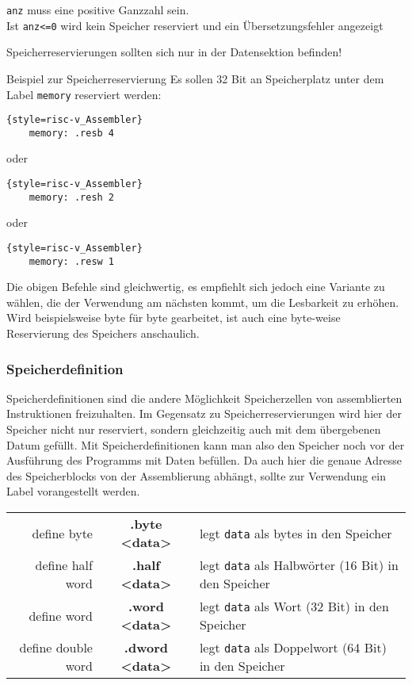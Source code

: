 \begin{warningblock}
	\texttt{anz} muss eine positive Ganzzahl sein.\\
	Ist \texttt{anz<=0} wird kein Speicher reserviert und ein Übersetzungsfehler angezeigt
\end{warningblock}

\begin{warningblock}
	Speicherreservierungen sollten sich nur in der Datensektion befinden!
\end{warningblock}

\begin{exampleblock}{Beispiel zur Speicherreservierung}
	Es sollen 32 Bit an Speicherplatz unter dem Label \texttt{memory} reserviert werden:\\
	\begin{lstlisting}{style=risc-v_Assembler}
	memory: .resb 4
	\end{lstlisting}
	oder
	\begin{lstlisting}{style=risc-v_Assembler}
	memory: .resh 2
	\end{lstlisting}
	oder
	\begin{lstlisting}{style=risc-v_Assembler}
	memory: .resw 1
	\end{lstlisting}
	Die obigen Befehle sind gleichwertig, es empfiehlt sich jedoch eine Variante zu wählen, die der Verwendung am nächsten kommt, um die Lesbarkeit zu erhöhen. Wird beispielsweise byte für byte gearbeitet, ist auch eine byte-weise Reservierung des Speichers anschaulich. 
\end{exampleblock}

\subsubsection{Speicherdefinition}

Speicherdefinitionen sind die andere Möglichkeit Speicherzellen von assemblierten Instruktionen freizuhalten. Im Gegensatz zu Speicherreservierungen wird hier der Speicher nicht nur reserviert, sondern gleichzeitig auch mit dem übergebenen Datum gefüllt. Mit Speicherdefinitionen kann man also den Speicher noch vor der Ausführung des Programms mit Daten befüllen. Da auch hier die genaue Adresse des Speicherblocks von der Assemblierung abhängt, sollte zur Verwendung ein Label vorangestellt werden.\\

\begin{centering}
	\begin{tabular}{rcl}
		define byte & \textbf{.byte <data>} & legt \texttt{data} als bytes in den Speicher\\
		define half word & \textbf{.half <data>} & legt \texttt{data} als Halbwörter (16 Bit) in den Speicher\\
		define word & \textbf{.word <data>} & legt \texttt{data} als Wort (32 Bit) in den Speicher\\
		define double word & \textbf{.dword <data>} & legt \texttt{data} als Doppelwort (64 Bit) in den Speicher\\
	\end{tabular}
\end{centering}

